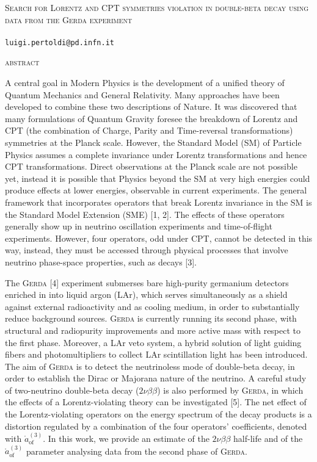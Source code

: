 \documentclass[11pt, a4paper]{article}
\newcommand{\aof}{\mathring{a}_\text{of}^{(3)}}
\begin{document}
\begin{center}
	\Large{\textsc{Search for Lorentz and CPT symmetries violation in double-beta decay using data from the \textsc{Gerda} experiment}} \\
	\vspace{1cm}
	 \\
	\normalsize{\texttt{luigi.pertoldi@pd.infn.it}}
	\vspace{1cm}
\end{center}
\centerline{\large\textsc{abstract}}\vspace{8pt}
A central goal in Modern Physics is the development of a unified theory of Quantum Mechanics and General Relativity. Many approaches have been developed to combine these two descriptions of Nature. It was discovered that many formulations of Quantum Gravity foresee the breakdown of Lorentz and CPT (the combination of Charge, Parity and Time-reversal transformations) symmetries at the Planck scale. However, the Standard Model (SM) of Particle Physics assumes a complete invariance under Lorentz transformations and hence CPT transformations. Direct observations at the Planck scale are not possible yet, instead it is possible that Physics beyond the SM at very high energies could produce effects at lower energies, observable in current experiments. The general framework that incorporates operators that break Lorentz invariance in the SM is the Standard Model Extension (SME) [1, 2]. The effects of these operators generally show up in neutrino oscillation experiments and time-of-flight experiments. However, four operators, odd under CPT, cannot be detected in this way, instead, they must be accessed through physical processes that involve neutrino phase-space properties, such as decays [3].

The \textsc{Gerda} [4] experiment submerses bare high-purity germanium detectors enriched in  into liquid argon (LAr), which serves simultaneously as a shield against external radioactivity and as cooling medium, in order to substantially reduce background sources. \textsc{Gerda} is currently running its second phase, with structural and radiopurity improvements and more active mass with respect to the first phase. Moreover, a LAr veto system, a hybrid solution of light guiding fibers and photomultipliers to collect LAr scintillation light has been introduced. The aim of \textsc{Gerda} is to detect the neutrinoless mode of double-beta decay, in order to establish the Dirac or Majorana nature of the neutrino. A careful study of two-neutrino double-beta decay ($2\nu\beta\beta$) is also performed by \textsc{Gerda}, in which the effects of a Lorentz-violating theory can be investigated [5]. The net effect of the Lorentz-violating operators on the energy spectrum of the decay products is a distortion regulated by a combination of the four operators' coefficients, denoted with $\aof$. In this work, we provide an estimate of the $2\nu\beta\beta$ half-life and of the $\aof$ parameter analysing data from the second phase of \textsc{Gerda}.
\end{document}
